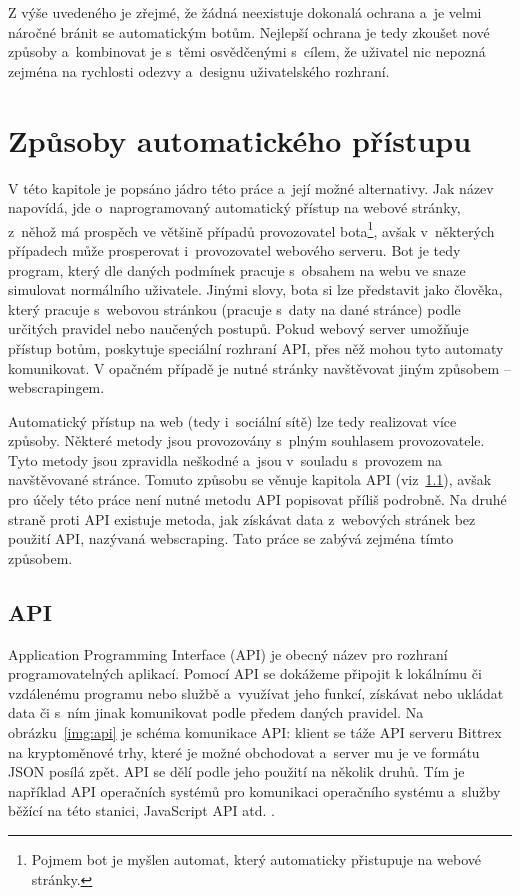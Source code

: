 Z výše uvedeného je zřejmé, že žádná neexistuje dokonalá ochrana a~je velmi náročné bránit se automatickým botům. Nejlepší ochrana je tedy zkoušet nové způsoby a~kombinovat je s~těmi osvědčenými s~cílem, že uživatel nic nepozná zejména na rychlosti odezvy a~designu uživatelského rozhraní. 

\chapter{Způsoby automatického přístupu}
\label{chap:auto_approach_to_web}
V této kapitole je popsáno jádro této práce a~její možné alternativy. Jak název napovídá, jde o~naprogramovaný automatický přístup na webové stránky, z~něhož má prospěch ve většině případů provozovatel bota\footnote{Pojmem bot je myšlen automat, který automaticky přistupuje na webové stránky.}, avšak v~některých případech může prosperovat i~provozovatel webového serveru. Bot je tedy program, který dle daných podmínek pracuje s~obsahem na webu ve snaze simulovat normálního uživatele. Jinými slovy, bota si lze představit jako člověka, který pracuje s~webovou stránkou (pracuje s~daty na dané stránce) podle určitých pravidel nebo naučených postupů. Pokud webový server umožňuje přístup botům, poskytuje speciální rozhraní API, přes něž mohou tyto automaty komunikovat. V opačném případě je nutné stránky navštěvovat jiným způsobem -- webscrapingem.

Automatický přístup na web (tedy i~sociální sítě) lze tedy realizovat více způsoby. Některé metody jsou provozovány s~plným souhlasem provozovatele. Tyto metody jsou zpravidla neškodné a~jsou v~souladu s~provozem na navštěvované stránce. Tomuto způsobu se věnuje kapitola API (viz~\ref{sec:api}), avšak pro účely této práce není nutné metodu API popisovat příliš podrobně. Na druhé straně proti API existuje metoda, jak získávat data z~webových stránek bez použití API, nazývaná webscraping. Tato práce se zabývá zejména tímto způsobem.

\section{API}
\label{sec:api}
Application Programming Interface (API) je obecný název pro rozhraní programovatelných aplikací. Pomocí API se dokážeme připojit k lokálnímu či vzdálenému programu nebo službě a~využívat jeho funkcí, získávat nebo ukládat data či s~ním jinak komunikovat podle předem daných pravidel. Na obrázku~\ref{img:api} je schéma komunikace API: klient se táže API serveru Bittrex na kryptoměnové trhy, které je možné obchodovat a~server mu je ve formátu JSON posílá zpět. API se dělí podle jeho použití na několik druhů. Tím je například API operačních systémů pro komunikaci operačního systému a~služby běžící na této stanici, JavaScript API atd. \cite{bib:API_introduction}. 

